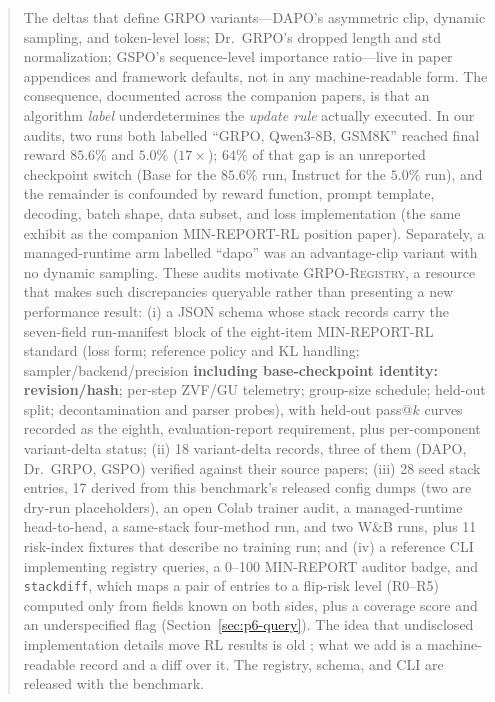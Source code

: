 \begin{abstract}
The deltas that define GRPO variants---DAPO's asymmetric clip, dynamic sampling,
and token-level loss; Dr.~GRPO's dropped length and std normalization; GSPO's
sequence-level importance ratio---live in paper appendices and framework
defaults, not in any machine-readable form. The consequence, documented across
the \ours{} companion papers, is that an algorithm \emph{label} underdetermines the
\emph{update rule} actually executed. In our audits, two runs both labelled
``GRPO, Qwen3-8B, GSM8K'' reached final reward $85.6\%$ and $5.0\%$ ($17\times$);
$64\%$ of that gap is an unreported checkpoint switch (Base for the $85.6\%$
run, Instruct for the $5.0\%$ run), and the remainder is confounded by reward function, prompt template,
decoding, batch shape, data subset, and loss implementation (the same exhibit as
the companion MIN-REPORT-RL position paper). Separately, a managed-runtime arm labelled ``dapo'' was an
advantage-clip variant with no dynamic sampling. These audits motivate \textsc{GRPO-Registry}, a resource that makes
such discrepancies queryable rather than presenting a new performance result:
(i) a JSON schema whose stack records carry the seven-field run-manifest block
of the eight-item MIN-REPORT-RL standard (loss form; reference policy and KL handling;
sampler/backend/precision \textbf{including base-checkpoint identity: revision/hash};
per-step ZVF/GU telemetry; group-size schedule;
held-out split; decontamination and parser probes), with held-out pass@$k$
curves recorded as the eighth, evaluation-report requirement, plus per-component
variant-delta status; (ii) 18 variant-delta records, three of them (DAPO, Dr.~GRPO, GSPO) verified
against their source papers; (iii) 28 seed stack entries, 17 derived from
this benchmark's released config dumps (two are dry-run placeholders), an open
Colab trainer audit, a managed-runtime head-to-head, a same-stack four-method
run, and two W\&B runs, plus 11 risk-index fixtures that describe no training
run; and (iv) a reference CLI implementing registry
queries, a 0--100 MIN-REPORT auditor badge, and \texttt{stackdiff}, which maps a
pair of entries to a flip-risk level (R0--R5) computed only from fields known
on both sides, plus a coverage score and an underspecified flag
(Section~\ref{sec:p6-query}). The idea that undisclosed implementation details
move RL results is old \citep{henderson2018deep, engstrom2020implementation};
what we add is a machine-readable record and a diff over it. The registry, schema, and CLI are
released with the benchmark.

\end{abstract}
